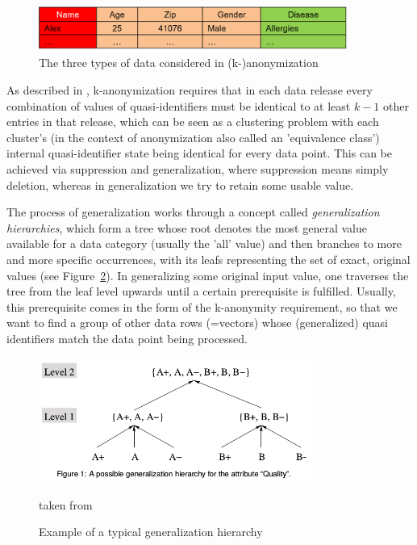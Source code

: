 	\begin{figure}[ht]
		\begin{center}
			\includegraphics[width=0.9\textwidth]{figures/anonym/3typesofdata}
			\caption{The three types of data considered in (k-)anonymization}
			\label{fig:anon_categories}
		\end{center}
	\end{figure}
	
	As described in \citep{ciriani2007kappa}, k-anonymization requires that in each data release every combination of values of quasi-identifiers must be identical to at least $k-1$ other entries in that release, which can be seen as a clustering problem with each cluster's (in the context of anonymization also called an 'equivalence class') internal quasi-identifier state being identical for every data point. This can be achieved via suppression and generalization, where suppression means simply deletion, whereas in generalization we try to retain some usable value.
	
	The process of generalization works through a concept called \textit{generalization hierarchies}, which form a tree whose root denotes the most general value available for a data category (usually the 'all' value) and then branches to more and more specific occurrences, with its leafs representing the set of exact, original values (see Figure~\ref{fig:gen_hierarchy}). In generalizing some original input value, one traverses the tree from the leaf level upwards until a certain prerequisite is fulfilled. Usually, this prerequisite comes in the form of the k-anonymity requirement, so that we want to find a group of other data rows (=vectors) whose (generalized) quasi identifiers match the data point being processed.
	
	\begin{figure}[ht]
		\begin{center}
			\includegraphics[width=0.8\textwidth]{figures/anonym/gen_hierarchy}
			\caption{Example of a typical generalization hierarchy}
			\label{fig:gen_hierarchy}
			\small
			taken from \citep{aggarwal2005approximation}
		\end{center}
	\end{figure}
	
